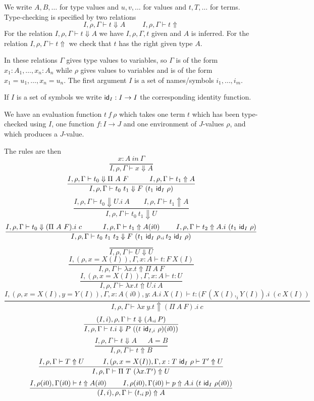 \documentclass[10pt,a4paper]{article}
\newcommand{\ID}{{\sf id}}
\begin{document}
 We write $A,B,\dots$ for type values and $u,v,\dots$ for values and $t,T,\dots$ for terms.
Type-checking is specified by two relations
$$
I,\rho,\Gamma\vdash t\Downarrow A~~~~~~~~~~~I,\rho,\Gamma\vdash t\Uparrow
$$
For the relation $I,\rho,\Gamma\vdash t\Downarrow A$ we have $I,\rho,\Gamma,t$ given and
$A$ is inferred. For the relation $I,\rho,\Gamma\vdash t\Uparrow$ we check that $t$ has
the right given type $A$.

 In these relations $\Gamma$ gives type values to variables, so $\Gamma$ is of the form
$x_1:A_1,\dots,x_n:A_n$ while $\rho$ gives values to variables and is of the form
$x_1 = u_1,\dots,x_n=u_n$. The first argument $I$ is a set of names/symbols
$i_1,\dots,i_m$. 

 If $I$ is a set of symbols we write $\ID_I:I\rightarrow I$ the corresponding identity function.

 We have an evaluation function $t~f~\rho$ which takes one term $t$ which has been type-checked
using $I$, one function $f:I\rightarrow J$ and one environment of $J$-values $\rho$, and which produces
a $J$-value.

 The rules are then
$$
\frac{x:A~in~\Gamma}{I,\rho,\Gamma\vdash x\Downarrow A}
$$
$$
\frac{I,\rho,\Gamma\vdash t_0\Downarrow\Pi~A~F~~~~~~~~~I,\rho,\Gamma\vdash t_1\Uparrow A}
     {I,\rho,\Gamma\vdash t_0~t_1\Downarrow F~(t_1~\ID_I~\rho)}
$$
$$
\frac{I,\rho,\Gamma\vdash t_0\Downarrow U.i~A~~~~~~~~~I,\rho,\Gamma\vdash t_1\Uparrow A}
     {I,\rho,\Gamma\vdash t_0~t_1\Downarrow U}
$$
$$
\frac{I,\rho,\Gamma\vdash t_0\Downarrow (\Pi~A~F).i~c~~~~~~~~~
      I,\rho,\Gamma\vdash t_1\Uparrow A(i0)~~~~~~~
      I,\rho,\Gamma\vdash t_2\Uparrow A.i~(t_1~\ID_I~\rho)}
     {I,\rho,\Gamma\vdash t_0~t_1~t_2\Downarrow F~(t_1~\ID_I~\rho,_i t_2~\ID_I~\rho)}
$$
$$
\frac{}{I,\rho,\Gamma\vdash U\Downarrow U}
$$
$$
\frac{I,(\rho,x=X(I)),\Gamma,x:A\vdash t:F~X(I)}{I,\rho,\Gamma\vdash \lambda x.t\Uparrow \Pi~A~F}
$$
$$
\frac{I,(\rho,x=X(I)),\Gamma,x:A\vdash t:U}{I,\rho,\Gamma\vdash \lambda x.t\Uparrow U.i~A}
$$
$$
\frac{I,(\rho,x=X(I),y=Y(I)),\Gamma,x:A(i0),y:A.i~X(I)\vdash t:(F~(X(I),_i Y(I)).i~(c~X(I))}
     {I,\rho,\Gamma\vdash \lambda x~y.t\Uparrow (\Pi~A~F).i~c}
$$
$$
\frac{(I,i),\rho,\Gamma\vdash t\Downarrow (A,_i P)}
     {I,\rho,\Gamma\vdash t.i\Downarrow P~((t~\ID_{I,i}~\rho)(i0))}
$$
$$
\frac{I,\rho,\Gamma\vdash t\Downarrow A~~~~~~~A = B}{I,\rho,\Gamma\vdash t\Uparrow B}
$$
$$
\frac{I,\rho,\Gamma\vdash T\Uparrow U~~~~~~~~I,(\rho,x=X(I)),\Gamma,x:T~\ID_I~\rho\vdash T'\Uparrow U}
     {I,\rho,\Gamma\vdash \Pi~T~(\lambda x.T')\Uparrow U}
$$
$$
\frac{I,\rho(i0),\Gamma(i0)\vdash t\Uparrow A(i0)~~~~~~~I,\rho(i0),\Gamma(i0)\vdash p\Uparrow A.i~(t~\ID_I~\rho(i0))}
     {(I,i),\rho,\Gamma\vdash (t,_i p)\Uparrow A}
$$
\end{document}
